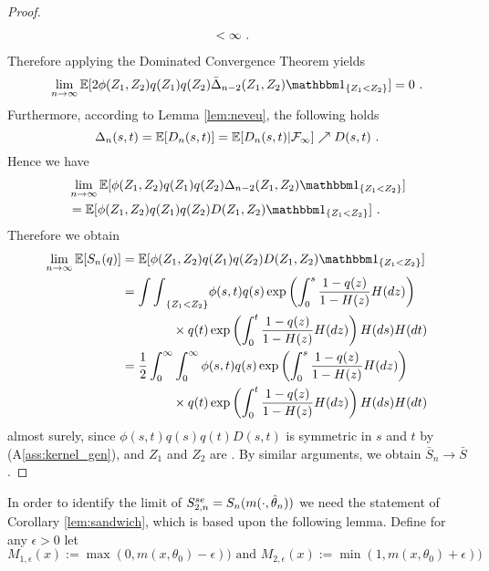 \begin{lemma}
\begin{proof}
\begin{align*}
			& < \infty\textrm{ .}
		\end{align*}
		Therefore applying the Dominated Convergence Theorem yields
		$$\lim\limits_{n\to\infty}\E[2\phi(Z_1,Z_2)q(Z_1)q(Z_2) \bar\Delta_{n-2}(Z_1, Z_2) \I{Z_1<Z_2}] = 0\mdot$$
		Furthermore, according to Lemma \ref{lem:neveu}, the following holds
		$$\Delta_{n}(s,t) = \mathbb{E}[D_n(s,t)] = \mathbb{E}[D_n(s,t)|\mathcal{F}_\infty] \nearrow D(s,t)\textrm{ .}$$
		Hence we have 
		\begin{align*}
			&\lim\limits_{n\to\infty}\E[\phi(Z_1,Z_2)q(Z_1)q(Z_2) \Delta_{n-2}(Z_1, Z_2) \I{Z_1<Z_2}] \\
			&= \E[\phi(Z_1,Z_2)q(Z_1)q(Z_2) D(Z_1, Z_2) \I{Z_1<Z_2}]\mdot
		\end{align*}
		Therefore we obtain 
		\begin{align*}
		\lim\limits_{n\to\infty}\E[S_n(q)]&= \E[\phi(Z_1,Z_2)q(Z_1)q(Z_2) D(Z_1, Z_2) \I{Z_1<Z_2}]\\
		&= {\int\int}_{\{Z_1<Z_2\}} \phi(s,t)q(s)\exp\left(\int_{0}^{s} \frac{1-q(z)}{1-H(z)} H(dz)\right) \\
		&\qquad\qquad \times q(t) \exp\left(\int_{0}^{t} \frac{1-q(z)}{1-H(z)} H(dz)\right) H(ds)H(dt)\\
		&= \frac{1}{2}\int_{0}^{\infty}\int_{0}^{\infty}\phi(s,t)q(s) \exp\left(\int_{0}^{s} \frac{1-q(z)}{1-H(z)} H(dz)\right)\\
		&\qquad\qquad \times q(t)\exp\left(\int_{0}^{t} \frac{1-q(z)}{1-H(z)} H(dz)\right) H(ds)H(dt)
		\end{align*}
		almost surely, since $\phi(s,t)q(s)q(t)D(s,t)$ is symmetric in $s$ and $t$ by (A\ref{ass:kernel_gen}), and $Z_1$ and $Z_2$ are \iid. By similar arguments, we obtain $\bar{S}_n \to \bar{S}$ \wpo. 
	\end{proof}
\end{lemma}
%
In order to identify the limit of $S_{2,n}^{se} = S_n(m(\cdot, \hat\theta_n))$ we need the statement of Corollary \ref{lem:sandwich}, which is based upon the following lemma. Define for any $\epsilon >0$ let
$$M_{1,\epsilon}(x) := \max(0, m(x, \theta_0) - \epsilon)) \textrm{ and } M_{2,\epsilon}(x) := \min(1, m(x, \theta_0) + \epsilon))$$
